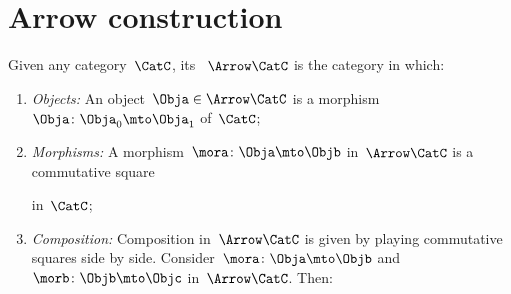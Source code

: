 
\section{Arrow construction}


\begin{ctdefinition}
	\label{def:arrow_category}
	Given any category~$\CatC$, its \emph{}~$\Arrow\CatC$ is the category in which:
	\begin{enumerate}
		\item \emph{Objects:} An object~$\Obja \in \Arrow\CatC$ is a morphism~$\Obja\colon \Obja_0\mto \Obja_1$ of~$\CatC$;
		\item \emph{Morphisms:} A morphism~$\mora\colon \Obja \mto \Objb$ in~$\Arrow\CatC$ is a commutative square
		      \begin{center}
		      \end{center}
		      in~$\CatC$;
		\item \emph{Composition:} Composition in~$\Arrow \CatC$ is given by playing commutative squares side by side.
		      Consider~$\mora\colon \Obja \mto \Objb$ and~$\morb\colon \Objb \mto \Objc$ in~$\Arrow\CatC$.
		      Then:
		      \begin{center}
		      \end{center}
	\end{enumerate}
\end{ctdefinition}

